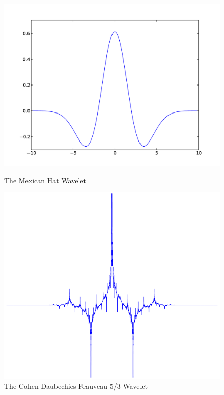 \begin{figure}[H]
    \includegraphics[width=\linewidth]{mexicanHat}
    \caption{The Mexican Hat Wavelet}
\endminipage\hfill
{}
    \includegraphics[width=\linewidth]{db5_3}
    \caption{The Cohen-Daubechies-Feauveau 5/3 Wavelet}
\endminipage
\end{figure}